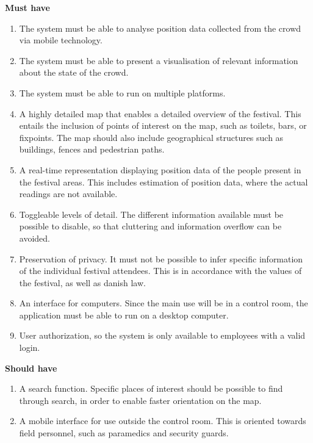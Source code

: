 \iffalse
\textbf{Must have}
\begin{enumerate}
    \item The system must be able to analyse position data collected from the crowd via mobile technology.
    \item The system must be able to present a visualisation of relevant information about the state of the crowd.
    \item The system must be able to run on multiple platforms.
    \item A highly detailed map that enables a detailed overview of the festival. This entails the inclusion of points of interest on the map, such as toilets, bars, or fixpoints. The map should also include geographical structures such as buildings, fences and pedestrian paths.
    \item A real-time representation displaying position data of the people present in the festival areas. This includes estimation of position data, where the actual readings are not available.
    \item Toggleable levels of detail. The different information available must be possible to disable, so that cluttering and information overflow can be avoided.
    \item Preservation of privacy. It must not be possible to infer specific information of the individual festival attendees. This is in accordance with the values of the festival, as well as danish law.
    \item An interface for computers. Since the main use will be in a control room, the application must be able to run on a desktop computer.
    \item User authorization, so the system is only available to employees with a valid login.
\end{enumerate}

\textbf{Should have}
\begin{enumerate}[resume]
    \item A search function. Specific places of interest should be possible to find through search, in order to enable faster orientation on the map.
    \item A mobile interface for use outside the control room. This is oriented towards field personnel, such as paramedics and security guards.
\end{enumerate}

